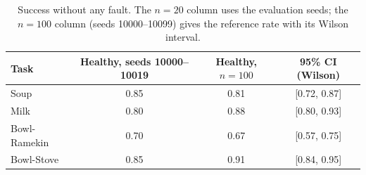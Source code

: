\begin{table}[t]
\centering
\caption{Success without any fault. The $n{=}20$ column uses the evaluation seeds; the $n{=}100$ column (seeds 10000--10099) gives the reference rate with its Wilson interval.}
\label{tab:nofault}
\setlength{\tabcolsep}{3pt}
\begin{tabular}{lccc}
\toprule
Task & Healthy, seeds 10000--10019 & Healthy, $n{=}100$ & 95\% CI (Wilson) \\
\midrule
Soup & 0.85 & 0.81 & [0.72, 0.87] \\
Milk & 0.80 & 0.88 & [0.80, 0.93] \\
Bowl-Ramekin & 0.70 & 0.67 & [0.57, 0.75] \\
Bowl-Stove & 0.85 & 0.91 & [0.84, 0.95] \\
\bottomrule
\end{tabular}
\end{table}
